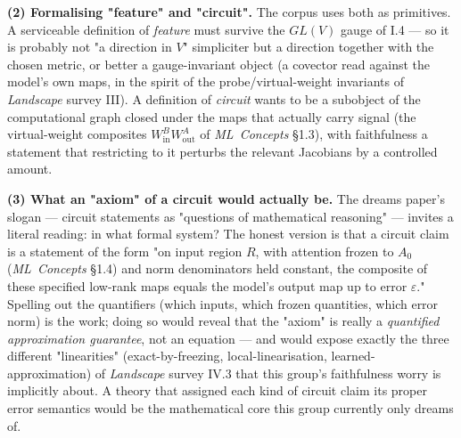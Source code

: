 \textbf{(2) Formalising "feature" and "circuit".} The corpus uses both as primitives. A serviceable definition of \emph{feature} must survive the $GL(V)$ gauge of I.4 --- so it is probably not "a direction in $V$" simpliciter but a direction together with the chosen metric, or better a gauge-invariant object (a covector read against the model's own maps, in the spirit of the probe/virtual-weight invariants of \emph{Landscape} survey III). A definition of \emph{circuit} wants to be a subobject of the computational graph closed under the maps that actually carry signal (the virtual-weight composites $W_{\mathrm{in}}^B W_{\mathrm{out}}^A$ of \emph{ML~Concepts} \S1.3), with faithfulness a statement that restricting to it perturbs the relevant Jacobians by a controlled amount.

\textbf{(3) What an "axiom" of a circuit would actually be.} The dreams paper's slogan --- circuit statements as "questions of mathematical reasoning" --- invites a literal reading: in what formal system? The honest version is that a circuit claim is a statement of the form "on input region $R$, with attention frozen to $A_0$ (\emph{ML~Concepts} \S1.4) and norm denominators held constant, the composite of these specified low-rank maps equals the model's output map up to error $\varepsilon$." Spelling out the quantifiers (which inputs, which frozen quantities, which error norm) is the work; doing so would reveal that the "axiom" is really a \emph{quantified approximation guarantee}, not an equation --- and would expose exactly the three different "linearities" (exact-by-freezing, local-linearisation, learned-approximation) of \emph{Landscape} survey IV.3 that this group's faithfulness worry is implicitly about. A theory that assigned each kind of circuit claim its proper error semantics would be the mathematical core this group currently only dreams of.


\printbibliography

